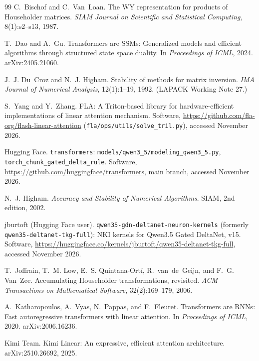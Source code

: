 \documentclass[11pt]{article}
\theoremstyle{remark}
\begin{document}
\begin{thebibliography}{99}
C.~Bischof and C.~Van~Loan.
\newblock The WY representation for products of Householder matrices.
\newblock \emph{SIAM Journal on Scientific and Statistical Computing}, 8(1):s2--s13, 1987.

T.~Dao and A.~Gu.
\newblock Transformers are SSMs: Generalized models and efficient algorithms through structured state space duality.
\newblock In \emph{Proceedings of ICML}, 2024. arXiv:2405.21060.

J.~J. Du~Croz and N.~J. Higham.
\newblock Stability of methods for matrix inversion.
\newblock \emph{IMA Journal of Numerical Analysis}, 12(1):1--19, 1992. (LAPACK Working Note 27.)

S.~Yang and Y.~Zhang.
\newblock FLA: A Triton-based library for hardware-efficient implementations of linear attention mechanism.
\newblock Software, \url{https://github.com/fla-org/flash-linear-attention} (\texttt{fla/ops/utils/solve\_tril.py}), accessed
November 2026.

Hugging Face.
\newblock \texttt{transformers}: \texttt{models/qwen3\_5/modeling\_qwen3\_5.py}, \texttt{torch\_chunk\_gated\_delta\_rule}.
\newblock Software, \url{https://github.com/huggingface/transformers}, main branch, accessed November 2026.

N.~J. Higham.
\newblock \emph{Accuracy and Stability of Numerical Algorithms}.
\newblock SIAM, 2nd edition, 2002.

jburtoft (Hugging Face user).
\newblock \texttt{qwen35-gdn-deltanet-neuron-kernels} (formerly \texttt{qwen35-deltanet-tkg-full}): NKI kernels for Qwen3.5 Gated
DeltaNet, v15.
\newblock Software, \url{https://huggingface.co/kernels/jburtoft/qwen35-deltanet-tkg-full}, accessed November 2026.

T.~Joffrain, T.~M. Low, E.~S. Quintana-Ort\'i, R.~van~de~Geijn, and F.~G. Van~Zee.
\newblock Accumulating Householder transformations, revisited.
\newblock \emph{ACM Transactions on Mathematical Software}, 32(2):169--179, 2006.

A.~Katharopoulos, A.~Vyas, N.~Pappas, and F.~Fleuret.
\newblock Transformers are RNNs: Fast autoregressive transformers with linear attention.
\newblock In \emph{Proceedings of ICML}, 2020. arXiv:2006.16236.

Kimi Team.
\newblock Kimi Linear: An expressive, efficient attention architecture.
\newblock arXiv:2510.26692, 2025.


\end{thebibliography}
\end{document}
